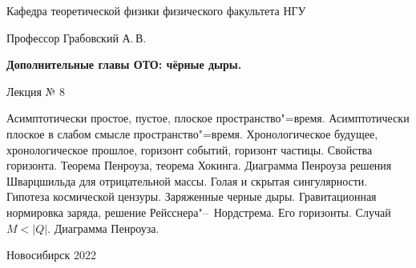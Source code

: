 \documentclass[12pt,pagesize,paper=192mm:108mm,landscape]{scrbook}
\begin{document}
\begin{titlepage}
\begin{center}
    Кафедра теоретической физики физического факультета НГУ
    \medskip

    \Large
    Профессор Грабовский А.\,В.
    \smallskip

    \Large
    \textbf{Дополнительные главы ОТО: чёрные дыры.}
    \smallskip

    \Large
    Лекция № 8
    \vfill

    \normalsize
    \begin{minipage}{0.85\linewidth}
      Асимптотически простое, пустое, плоское
      пространство"=время. Асимптотически плоское в слабом смысле
      пространство"=время. Хронологическое будущее, хронологическое
      прошлое, горизонт событий, горизонт частицы. Свойства
      горизонта. Теорема Пенроуза, теорема Хокинга. Диаграмма Пенроуза
      решения Шварцшильда для отрицательной массы. Голая и скрытая
      сингулярности. Гипотеза космической цензуры. Заряженные черные
      дыры. Гравитационная нормировка заряда, решение
      Рейсснера"--~Нордстрема. Его горизонты. Случай $M<|Q|$. Диаграмма
      Пенроуза.
     \end{minipage}
    \vfill

    \normalsize \ccbysa\hspace{0.5em}  Новосибирск 2022
  \end{center}
\end{titlepage}
\end{document}

